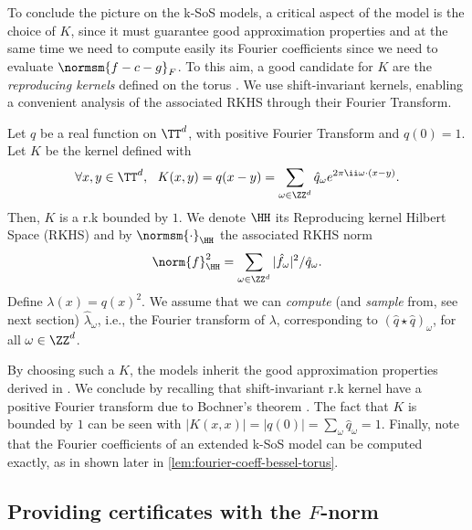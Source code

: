 \documentclass{article}
\begin{document}
To conclude the picture on the k-SoS models, a critical aspect of the model is the choice of $K$, since it must guarantee good approximation properties and at the same time we need to compute easily its Fourier coefficients since we need to evaluate $\normsm{f - c - g}_F$. To this aim, a good candidate for $K$ are the {\em reproducing kernels} defined on the torus \cite{steinwart2008support}. We use shift-invariant kernels, enabling a convenient analysis of the associated RKHS through their Fourier Transform.

\begin{definition}\label{def:rk-torus}
  Let $q$ be a real function on $\TT^d$, with positive Fourier Transform and $q(0) = 1$. Let $K$ be the kernel defined with
  \begin{equation}\label{eq:def-kernel-torus}
    \forall x, y \in \TT^d, ~~ K(x, y) = q(x - y) = \sum_{\omega \in \ZZ^d} \hat{q}_\omega e^{2\pi \ii \omega \cdot (x - y)}.
  \end{equation}
  Then, $K$ is a r.k bounded by $1$. We denote $\HH$ its Reproducing kernel Hilbert Space (RKHS) and by $\normsm{\cdot}_{\HH}$ the associated RKHS norm
  \begin{equation*}
    \norm{f}_\HH^2 = \sum_{\omega \in \ZZ^d} |\hat{f}_\omega|^2 / \hat{q}_\omega.
  \end{equation*}
  Define $\lambda(x) = q(x)^2$. We assume that we can \emph{compute} (and \emph{sample} from, see next section) $\hat{\lambda}_\omega$, i.e., the Fourier transform of $\lambda$, corresponding to $(\hat{q} \star \hat{q})_\omega$, for all $\omega \in \ZZ^d$.
\end{definition}

By choosing such a $K$, the models inherit the good approximation properties derived in \cite{marteau-fereyNonparametricModelsNonnegative2020,rudiPSDRepresentationsEffective2021}. We conclude by recalling that shift-invariant r.k kernel have a positive Fourier transform due to Bochner's theorem \cite{rudinBasicTheoremsFourier1990}. The fact that $K$ is bounded by $1$ can be seen with $|K(x, x)| = |q(0)| = \sum_{\omega} \hat{q}_\omega = 1$. Finally, note that the Fourier coefficients of an extended k-SoS model can be computed exactly, as in shown \eg later in \cref{lem:fourier-coeff-bessel-torus}.

\subsection{Providing certificates with the \texorpdfstring{$F$}{F}-norm}
\end{document}
